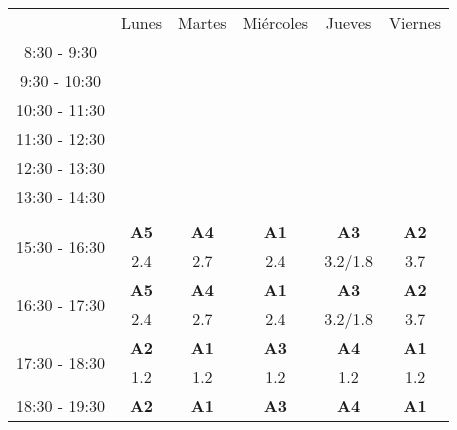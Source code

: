 \documentclass[10pt,spanish, landscape, twocolumn]{article}
\begin{document}
\begin{flushright}
\begin{tabular}{|c|c|c|c|c|c|}
\hline
\rowcolor{amarillo} \multicolumn{6}{|c|}{\textbf{Segundo Cuatrimestre}} \\
\hline
& Lunes & Martes & Miércoles & Jueves & Viernes \\
\hline
\multirow{2}{*}{8:30 - 9:30} & & & & & \\
& & & & &  \\
\hline
\multirow{2}{*}{9:30 - 10:30} & & & & & \\
& & & & & \\
\hline
\multirow{2}{*}{10:30 - 11:30} & & & & & \\
& & & & & \\
\hline
\multirow{2}{*}{11:30 - 12:30} & & & & & \\
& & & & & \\
\hline
\multirow{2}{*}{12:30 - 13:30} & & & & & \\
& & & & & \\
\hline
\multirow{2}{*}{13:30 - 14:30} & & & & & \\
& & & & & \\
\hline
\rowcolor{gris} \multicolumn{6}{|c|}{} \\
\hline
\multirow{2}{*}{15:30 - 16:30} & \textbf{A5} & \textbf{A4} & \textbf{A1} & \textbf{A3} & \textbf{A2} \\
& {\footnotesize 2.4} & {\footnotesize 2.7} & {\footnotesize 2.4} & {\footnotesize 3.2/1.8} & {\footnotesize 3.7} \\
\hline
\multirow{2}{*}{16:30 - 17:30} & \textbf{A5} & \textbf{A4} & \textbf{A1} & \textbf{A3} & \textbf{A2} \\
& {\footnotesize 2.4} & {\footnotesize 2.7} & {\footnotesize 2.4} & {\footnotesize 3.2/1.8} & {\footnotesize 3.7} \\
\hline
\multirow{2}{*}{17:30 - 18:30} & \cellcolor{grisclaro} \textbf{A2} & \cellcolor{grisclaro} \textbf{A1} & \cellcolor{grisclaro} \textbf{A3} & \cellcolor{grisclaro} \textbf{A4} & \cellcolor{grisclaro} \textbf{A1} \\
& \cellcolor{grisclaro} {\footnotesize 1.2}& \cellcolor{grisclaro} {\footnotesize 1.2}& \cellcolor{grisclaro} {\footnotesize 1.2}& \cellcolor{grisclaro} {\footnotesize 1.2}& \cellcolor{grisclaro} {\footnotesize 1.2}\\
\hline
\multirow{2}{*}{18:30 - 19:30} & \cellcolor{grisclaro} \textbf{A2} & \cellcolor{grisclaro} \textbf{A1} & \cellcolor{grisclaro} \textbf{A3} & \cellcolor{grisclaro} \textbf{A4} & \cellcolor{grisclaro} \textbf{A1} \\

\end{tabular}
\end{flushright}
\end{document}
